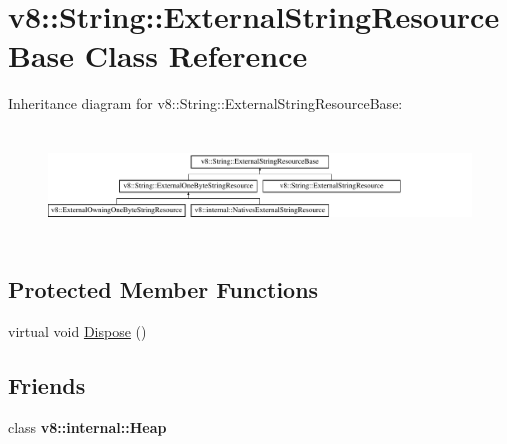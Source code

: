 \hypertarget{classv8_1_1String_1_1ExternalStringResourceBase}{\section{v8\-:\-:String\-:\-:External\-String\-Resource\-Base Class Reference}
\label{classv8_1_1String_1_1ExternalStringResourceBase}
}
Inheritance diagram for v8\-:\-:String\-:\-:External\-String\-Resource\-Base\-:\begin{figure}[H]
\begin{center}
\leavevmode
\includegraphics[height=3.000000cm]{classv8_1_1String_1_1ExternalStringResourceBase}
\end{center}
\end{figure}
\subsection*{Protected Member Functions}
\begin{DoxyCompactItemize}
\item 
virtual void \hyperlink{classv8_1_1String_1_1ExternalStringResourceBase_af4720342ae31e1ab4656df3f15d069c0}{Dispose} ()
\end{DoxyCompactItemize}
\subsection*{Friends}
\begin{DoxyCompactItemize}
\item 
\hypertarget{classv8_1_1String_1_1ExternalStringResourceBase_a2d52f783e6ad51ce2c8f89eb1ebc7599}{class {\bfseries v8\-::internal\-::\-Heap}}\label{classv8_1_1String_1_1ExternalStringResourceBase_a2d52f783e6ad51ce2c8f89eb1ebc7599}

\end{DoxyCompactItemize}


